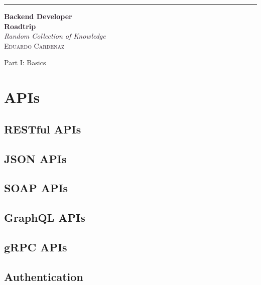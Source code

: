 \documentclass[a4paper]{article}
\begin{document}
    \begin{titlepage}
        \raggedleft
        \rule{1pt}{\textheight}
        \hspace{0.05\textwidth}
        \parbox[b]{0.75\textwidth}{
            {\Huge\bfseries \textcolor[HTML]{2A202C}{Backend Developer}\\[0.5\baselineskip] \textcolor[HTML]{2A202C}{Roadtrip}}\\[2\baselineskip]
            {\large\textit{\textcolor[HTML]{2A202C}{Random Collection of Knowledge}}}\\[4\baselineskip]
            {\Large\textsc{\textcolor[HTML]{2A202C}{Eduardo Cardenaz}}}
            
            \vspace{0.5\textheight}
        }
    \end{titlepage}

    \thispagestyle{empty} %
    \vspace*{\fill}
    \begin{center}
        \Huge Part I: Basics
    \end{center}
    \vspace*{\fill}
    \newpage

    \section{APIs}

    \subsection{RESTful APIs}
    \subsection{JSON APIs}
    \subsection{SOAP APIs}
    \subsection{GraphQL APIs}
    \subsection{gRPC APIs}
    
    \subsection{Authentication}
\end{document}
